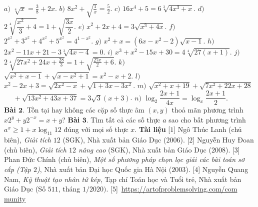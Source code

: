 \begin{multicols}{2}
	\vskip 0.1cm
	$a)$  $\sqrt[4]{x}=\frac{3}{8}+2x$.
	\vskip 0.1cm
	$b)$ $8x^2+\sqrt{\frac{1}{x}}=\frac{5}{2}.$
	\vskip 0.1cm
	$c)$ $16x^4+5=6\sqrt[3]{4x^3+x}.$
	\vskip 0.1cm
	$d)$ $ 2\sqrt[4]{\dfrac{x^{2}}{3}+4}=1+\sqrt{\dfrac{3x}{2}}.$
	\vskip 0.1cm
	$e)$ $x^2+2x+4=3\sqrt{x^3+4x}.$
	\vskip 0.1cm
	$f)$ $2^{x^2}+3^{x^2}+4^{x^2}+5^{x^2}=4^{1-x^2}.$
	\vskip 0.1cm
	$g)$ $x^2+x = (6x-x^2-2)\sqrt{x-1}.$
	\vskip 0.1cm
	$h)$ $2x^2-11x+21-3\sqrt[3]{4x-4}=0.$
	\vskip 0.1cm
	$i)$ $x^{3}+x^{2}-15x+30=4\sqrt[4]{27(x+1)}.$
	\vskip 0.1cm
	$j)$ $2\sqrt[4]{27x^2+24x+\frac{28}{3}}=1+\sqrt{\frac{27x}{2}+6}.$
	\vskip 0.1cm
	$k)$ $\sqrt{x^2+x-1}+\sqrt{x-x^2+1}=x^2-x+2.$
	\vskip 0.1cm
	$l)$ $x^2-2x+3=\sqrt{2x^2-x}+\sqrt{1+3x-3x^2}.$
	\vskip 0.1cm
	$m)$ $\sqrt{x^2+x+19}+\sqrt{7x^2+22x+28}$\\
	$\quad\,\,+\sqrt{13x^2+43x+37}=3\sqrt{3}(x+3)$.
	\vskip 0.1cm
	$n)$ $\log_2 \dfrac{2x+1}{4x} = \log_{x} \dfrac{2x+1}{2}.$\\
	\vskip 0.1cm
	\textbf{\color{diendantoanhoc}Bài $\pmb{2.}$} Tồn tại hay không các cặp số thực âm $(x,y)$ thoả mãn phương trình $x2^y+y2^{-x}=x+y$?
	\vskip 0.1cm
	\textbf{\color{diendantoanhoc}Bài $\pmb{3.}$} Tìm tất cả các số thực $a$ sao cho bất phương trình $a^x\geq 1+x\log _{11}12$ đúng với mọi số thực $x$.
	\vskip 0.1cm
	\textbf{\color{diendantoanhoc}Tài liệu}
	\vskip 0.1cm
	[$1$] Ngô Thúc Lanh (chủ biên), {\it Giải tích $12$ }(SGK), Nhà xuất bản Giáo Dục ($2006$).
	\vskip 0.1cm
	[$2$] Nguyễn Huy Đoan (chủ biên), {\it Giải tích $12$ nâng cao} (SGK), Nhà xuất bản Giáo Dục ($2008$).
	\vskip 0.1cm
	[$3$] Phan Đức Chính (chủ biên), {\it Một số phương pháp chọn lọc giải các bài toán sơ cấp (Tập $2$)}, Nhà xuất bản Đại học Quốc gia Hà Nội ($2003$). 
	\vskip 0.1cm
	[$4$] Nguyễn Quang Nam, {\it Kỹ thuật tạo nhân tử kép}, Tạp chí Toán học và Tuổi trẻ, Nhà xuất bản Giáo Dục (Số $511$, tháng $1/2020)$.
	\vskip 0.1cm
	[$5$]~\url{https://artofproblemsolving.com/com} \url{munity}
	\end{multicols}